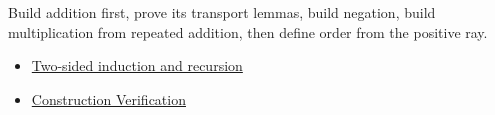\begin{remark*}
Build addition first, prove its transport lemmas, build negation, build
multiplication from repeated addition, then define order from the positive ray.
\end{remark*}

\begin{dependencies}
\begin{itemize}
  \item \hyperref[thm:two-sided-induction-and-recursion]{Two-sided induction and recursion}
  \item \hyperref[def:number-system-construction-verification]{Construction Verification}
\end{itemize}
\end{dependencies}

\clearpage
